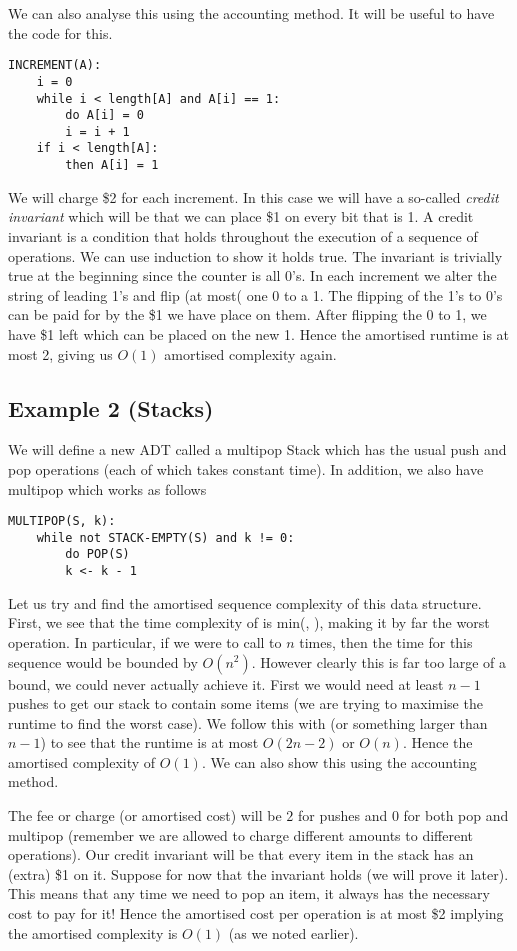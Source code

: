We can also analyse this using the accounting method. It will be useful to have the code for this.
\begin{lstlisting}
INCREMENT(A):
    i = 0
    while i < length[A] and A[i] == 1:
        do A[i] = 0
        i = i + 1
    if i < length[A]:
        then A[i] = 1
\end{lstlisting}

We will charge \$2 for each increment. In this case we will have a so-called \textit{credit invariant} which will be that we can place \$1 on every bit that is 1. A credit invariant is a condition that holds throughout the execution of a sequence of operations. We can use induction to show it holds true. The invariant is trivially true at the beginning since the counter is all 0's. In each increment we alter the string of leading 1's and flip (at most( one 0 to a 1. The flipping of the 1's to 0's can be paid for by the \$1 we have place on them. After flipping the 0 to 1, we have \$1 left which can be placed on the new 1. Hence the amortised runtime is at most 2, giving us $O(1)$ amortised complexity again.

\subsection{Example 2 (Stacks)}
We will define a new ADT called a multipop Stack which has the usual push and pop operations (each of which takes constant time). In addition, we also have multipop which works as follows
\begin{lstlisting}
MULTIPOP(S, k):
    while not STACK-EMPTY(S) and k != 0:
        do POP(S)
        k <- k - 1
\end{lstlisting}
Let us try and find the amortised sequence complexity of this data structure. First, we see that the time complexity of  is min(, ), making it by far the worst operation. In particular, if we were to call to  $n$ times, then the time for this sequence would be bounded by $O(n^2)$. However clearly this is far too large of a bound, we could never actually achieve it. First we would need at least $n - 1$ pushes to get our stack to contain some items (we are trying to maximise the runtime to find the worst case). We follow this with  (or something larger than $n - 1$) to see that the runtime is at most $O(2n - 2)$ or $O(n)$. Hence the amortised complexity of $O(1)$. We can also show this using the accounting method.

The fee or charge (or amortised cost) will be $2$ for pushes and 0 for both pop and multipop (remember we are allowed to charge different amounts to different operations). Our credit invariant will be that every item in the stack has an (extra) \$1 on it. Suppose for now that the invariant holds (we will prove it later). This means that any time we need to pop an item, it always has the necessary cost to pay for it! Hence the amortised cost per operation is at most \$2 implying the amortised complexity is $O(1)$ (as we noted earlier).

